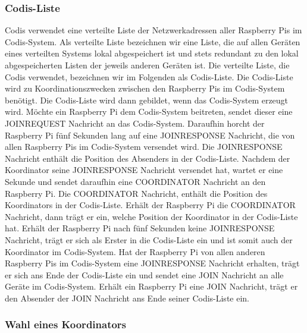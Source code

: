 \documentclass[journal]{IEEEtran}
\begin{document}
\subsubsection{Codis-Liste}

Codis verwendet eine verteilte Liste der Netzwerkadressen aller Raspberry Pis im Codis-System. Als verteilte Liste bezeichnen wir eine Liste, die auf allen Geräten eines verteilten Systems lokal abgespeichert ist und stets redundant zu den lokal abgespeicherten Listen der jeweils anderen Geräten ist. Die verteilte Liste, die Codis verwendet, bezeichnen wir im Folgenden als Codis-Liste. Die Codis-Liste wird zu Koordinationszwecken zwischen den Raspberry Pis im Codis-System benötigt.
Die Codis-Liste wird dann gebildet, wenn das Codis-System erzeugt wird. Möchte ein Raspberry Pi dem Codis-System beitreten, sendet dieser eine \MakeUppercase{joinrequest} Nachricht an das Codis-System. Daraufhin horcht der Raspberry Pi fünf Sekunden lang auf eine \MakeUppercase{joinresponse} Nachricht, die von allen Raspberry Pis im Codis-System versendet wird. Die \MakeUppercase{joinresponse} Nachricht enthält die Position des Absenders in der Codis-Liste. Nachdem der Koordinator seine \MakeUppercase{joinresponse} Nachricht versendet hat, wartet er eine Sekunde und sendet daraufhin eine \MakeUppercase{coordinator} Nachricht an den Raspberry Pi. Die \MakeUppercase{coordinator} Nachricht, enthält die Position des Koordinators in der Codis-Liste. Erhält der Raspberry Pi die \MakeUppercase{coordinator} Nachricht, dann trägt er ein, welche Position der Koordinator in der Codis-Liste hat. Erhält der Raspberry Pi nach fünf Sekunden keine \MakeUppercase{joinresponse} Nachricht, trägt er sich als Erster in die Codis-Liste ein und ist somit auch der Koordinator im Codis-System. Hat der Raspberry Pi von allen anderen Raspberry Pis im Codis-System eine \MakeUppercase{joinresponse} Nachricht erhalten, trägt er sich ans Ende der Codis-Liste ein und sendet eine \MakeUppercase{join} Nachricht an alle Geräte im Codis-System. Erhält ein Raspberry Pi eine \MakeUppercase{join} Nachricht, trägt er den Absender der \MakeUppercase{join} Nachricht ans Ende seiner Codis-Liste ein.

\subsubsection{Wahl eines Koordinators}
\end{document}
